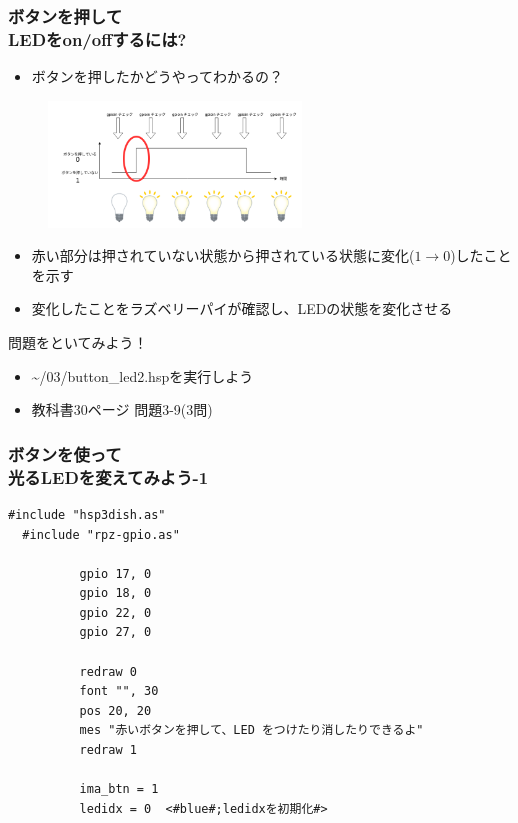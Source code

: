 \begin{frame}
  \frametitle{ボタンを押して\\LEDをon/offするには?}
  \begin{itemize}
    \item ボタンを押したかどうやってわかるの？
  \end{itemize}
  \begin{figure}
    \centering
    \includegraphics[width=0.6\textwidth]{../images/chap03/button_push.png}
  \end{figure}
  \begin{itemize}
    \item 赤い部分は押されていない状態から押されている状態に変化($1\rightarrow0$)したことを示す
    \item 変化したことをラズベリーパイが確認し、LEDの状態を変化させる
  \end{itemize}
\end{frame}

\begin{frame}
  \begin{exampleblock}{問題をといてみよう！}
    \begin{itemize}
      \item \sim/03/button\_led2.hspを実行しよう
      \item 教科書30ページ 問題3-9(3問)
    \end{itemize}
  \end{exampleblock} 
\end{frame}

\begin{frame}[fragile]
  \frametitle{ボタンを使って\\光るLEDを変えてみよう-1}
  \begin{lstlisting}[title=\sim/03/button\_led3.hsp 前半, label=button_led3.hsp-1]
  #include "hsp3dish.as"
  #include "rpz-gpio.as"
  
          gpio 17, 0   
          gpio 18, 0
          gpio 22, 0
          gpio 27, 0

          redraw 0
          font "", 30
          pos 20, 20
          mes "赤いボタンを押して、LED をつけたり消したりできるよ"
          redraw 1

          ima_btn = 1 
          ledidx = 0  <#blue#;ledidxを初期化#>
  \end{lstlisting}
\end{frame}

